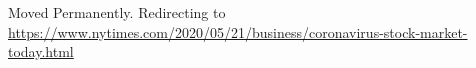 Moved Permanently. Redirecting to
\url{https://www.nytimes.com/2020/05/21/business/coronavirus-stock-market-today.html}
